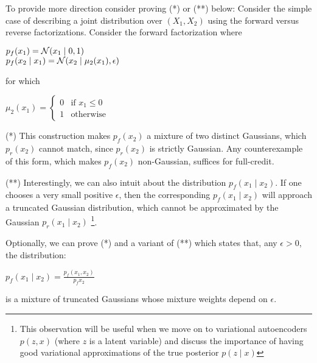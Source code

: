 \begin{answer}
    To provide more direction consider proving (*) or (**) below:
    Consider the simple case of describing a joint distribution over $(X_1,X_2)$ using 
    the forward versus reverse factorizations. Consider the forward factorization where

    \begin{center}
        $p_f(x_1) = \mathcal{N}(x_1 \mid 0,1)$ \\
        $p_f(x_2 \mid x_1) = \mathcal{N}(x_2 \mid \mu_2(x_1), \epsilon)$
    \end{center}

    for which

    \begin{center}
        $
        \mu_2(x_1) = 
        \begin{cases}
            0 & \text{if } x_1 \le 0 \\
            1 & \text{otherwise}
        \end{cases}
        $
    \end{center}

    (*) This construction makes $p_f(x_2)$ a mixture of two distinct Gaussians, which $p_r(x_2)$ cannot match, since $p_r(x_2)$ is 
    strictly Gaussian. Any counterexample of this form, which makes $p_f(x_2)$ non-Gaussian, suffices for full-credit.

    (**) Interestingly, we can also intuit about the distribution $p_f(x_1 \mid x_2)$. If one chooses a very small positive $\epsilon$, then the 
    corresponding $p_f(x_1 \mid x_2)$ will approach a truncated Gaussian distribution, which cannot be approximated by the Gaussian $p_r(x_1 \mid x_2)$
    \footnote{This observation will be useful when we move on to variational autoencoders $p(z,x)$ (where $z$ is a latent variable) and discuss the 
    importance of having good variational approximations of the true posterior $p(z \mid x)$}.

    Optionally, we can prove (*) and a variant of (**) which states that, any $\epsilon > 0$, the distribution:

    \begin{center}
        $p_f(x_1 \mid x_2) = \frac{p_f(x_1,x_2)}{p_f{x_2}}$
    \end{center}

    is a mixture of truncated Gaussians whose mixture weights depend on $\epsilon$.

\end{answer}

